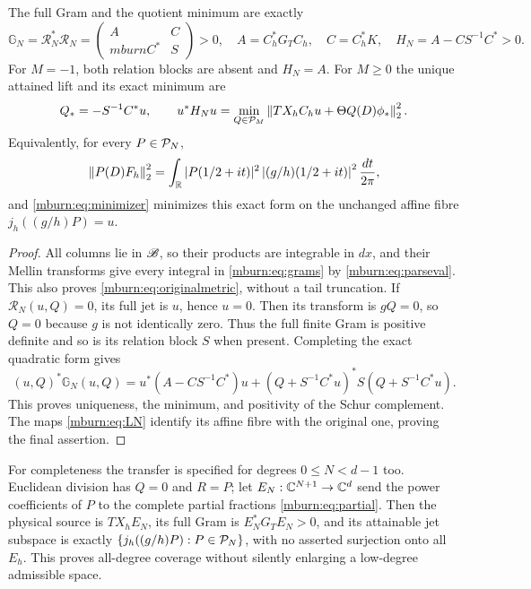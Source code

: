 \begin{mburntheorem}
\label{mburn:thm:gram}
The full Gram and the quotient minimum are exactly
\begin{equation}\label{mburn:eq:schur}
 \mathbb G_N=\mathcal R_N^*\mathcal R_N
   =\begin{pmatrix}A&C\\mburnC^*&S\end{pmatrix}>0,
 \quad A=C_h^*G_TC_h,\quad C=C_h^*K,\quad
 H_N=A-CS^{-1}C^*>0.
\end{equation}
For $M=-1$, both relation blocks are absent and $H_N=A$.
For $M\geq0$ the unique attained lift and its exact minimum are
\begin{equation}\label{mburn:eq:minimizer}
 Q_*=-S^{-1}C^*u,\qquad
 u^*H_Nu=\min_{Q\in\mathcal P_M}
          \left\lVert T X_hC_hu+\Theta Q(D)\phi_*\right\rVert_2^2.
\end{equation}
Equivalently, for every $P\in\mathcal P_N$,
\begin{equation}\label{mburn:eq:originalmetric}
 \left\lVert P(D)F_h\right\rVert_2^2
  =\int_\mathbb R|P(1/2+it)|^2\left|(g/h)(1/2+it)\right|^2
                                                   \frac{dt}{2\pi},
\end{equation}
and \eqref{mburn:eq:minimizer} minimizes this exact form on the
unchanged affine fibre $j_h((g/h)P)=u$.
\end{mburntheorem}
\begin{proof}
All columns lie in $\mathscr B$, so their products are integrable
in $dx$, and their Mellin transforms give every integral in
\eqref{mburn:eq:grams} by \eqref{mburn:eq:parseval}. This also proves
\eqref{mburn:eq:originalmetric}, without a tail truncation.
If $\mathcal R_N(u,Q)=0$, its full jet is $u$, hence $u=0$.
Then its transform is $gQ=0$, so $Q=0$ because $g$ is not
identically zero. Thus the full finite Gram is positive
definite and so is its relation block $S$ when present.
Completing the exact quadratic form gives
\[
 (u,Q)^*\mathbb G_N(u,Q)
 =u^*(A-CS^{-1}C^*)u
       +(Q+S^{-1}C^*u)^*S(Q+S^{-1}C^*u).
\]
This proves uniqueness, the minimum, and positivity of the
Schur complement. The maps \eqref{mburn:eq:LN} identify its affine
fibre with the original one, proving the final assertion.
\end{proof}

For completeness the transfer is specified for degrees
$0\leq N<d-1$ too. Euclidean division has $Q=0$ and $R=P$;
let $E_N:\mathbb C^{N+1}\to\mathbb C^d$ send the power coefficients of
$P$ to the complete partial fractions \eqref{mburn:eq:partial}.
Then the physical source is $TX_hE_N$, its full Gram is
$E_N^*G_TE_N>0$, and its attainable jet subspace is exactly
$\{j_h((g/h)P):P\in\mathcal P_N\}$, with no asserted surjection
onto all $E_h$. This proves all-degree coverage without
silently enlarging a low-degree admissible space.


